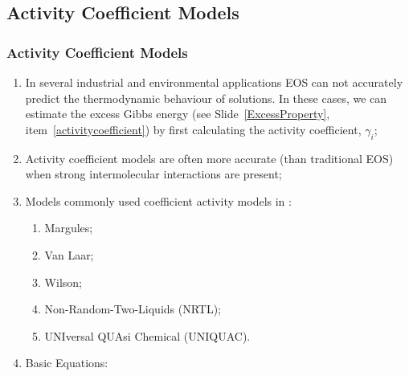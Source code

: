 \documentclass[10pt,compress,unknownkeysallowed]{beamer}
\begin{document}
\subsection{Activity Coefficient Models}

\begin{frame}
  \frametitle{Activity Coefficient Models}
  \begin{enumerate}%
      \item<1-> In several industrial and environmental applications EOS can not accurately predict the thermodynamic behaviour of solutions. In these cases, we can estimate the excess Gibbs energy  (see Slide~\ref{ExcessProperty}, item~\ref{activitycoefficient}) by first calculating the activity coefficient, $\gamma_{i}$;
      \item<2-> Activity coefficient models are often more accurate (than traditional EOS) when strong intermolecular interactions are present;
      \item<3-> Models commonly used coefficient activity models in :
          \begin{enumerate}
             \item<3-> Margules;
             \item<3-> Van Laar;
             \item<3-> Wilson;
             \item<3-> Non-Random-Two-Liquids (NRTL);
             \item<3-> UNIversal QUAsi Chemical (UNIQUAC).     
          \end{enumerate}
      \item<4-> Basic Equations:
  \end{enumerate}
\end{frame}
\normalsize
\end{document}
